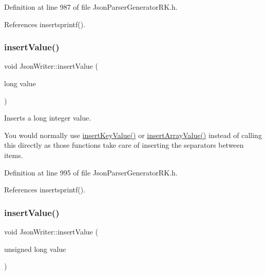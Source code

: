 Definition at line 987 of file Json\+Parser\+Generator\+R\+K.\+h.



References insertsprintf().

\mbox{\label{class_json_writer_a069e3c244a8a320eaa9dd5625874d98e}} 
\subsubsection{\texorpdfstring{insert\+Value()}{insertValue()}\hspace{0.1cm}{\footnotesize\ttfamily [4/9]}}
{\footnotesize\ttfamily void Json\+Writer\+::insert\+Value (\begin{DoxyParamCaption}\item[{long}]{value }\end{DoxyParamCaption})\hspace{0.3cm}{\ttfamily [inline]}}



Inserts a long integer value. 

You would normally use \hyperlink{class_json_writer_ac2de627389b59ce2c8ed95e10ea213bf}{insert\+Key\+Value()} or \hyperlink{class_json_writer_a8b4dc6726b66b4f277c7674e60c8a057}{insert\+Array\+Value()} instead of calling this directly as those functions take care of inserting the separators between items. 

Definition at line 995 of file Json\+Parser\+Generator\+R\+K.\+h.



References insertsprintf().

\mbox{\label{class_json_writer_a69d2d9ed9023105c3f84ce645919502b}} 
\subsubsection{\texorpdfstring{insert\+Value()}{insertValue()}\hspace{0.1cm}{\footnotesize\ttfamily [5/9]}}
{\footnotesize\ttfamily void Json\+Writer\+::insert\+Value (\begin{DoxyParamCaption}\item[{unsigned long}]{value }\end{DoxyParamCaption})\hspace{0.3cm}{\ttfamily [inline]}}




